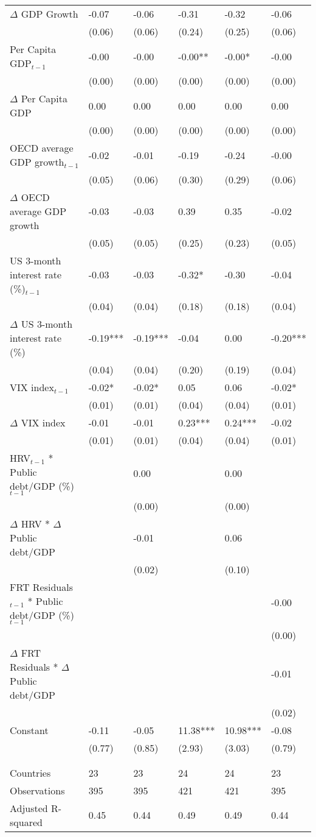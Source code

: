 \begin{tabular}{lp{3cm}p{3cm}p{3cm}p{3cm}p{3cm}}
  $\Delta$ GDP Growth & -0.07 & -0.06 & -0.31 & -0.32 & -0.06 \\ 
   & (0.06) & (0.06) & (0.24) & (0.25) & (0.06) \\ 
  Per Capita GDP$_{t-1}$ & -0.00 & -0.00 & -0.00** & -0.00* & -0.00 \\ 
   & (0.00) & (0.00) & (0.00) & (0.00) & (0.00) \\ 
  $\Delta$ Per Capita GDP & 0.00 & 0.00 & 0.00 & 0.00 & 0.00 \\ 
   & (0.00) & (0.00) & (0.00) & (0.00) & (0.00) \\ 
  OECD average GDP growth$_{t-1}$ & -0.02 & -0.01 & -0.19 & -0.24 & -0.00 \\ 
   & (0.05) & (0.06) & (0.30) & (0.29) & (0.06) \\ 
  $\Delta$ OECD average GDP growth & -0.03 & -0.03 & 0.39 & 0.35 & -0.02 \\ 
   & (0.05) & (0.05) & (0.25) & (0.23) & (0.05) \\ 
  US 3-month interest rate (\%)$_{t-1}$ & -0.03 & -0.03 & -0.32* & -0.30 & -0.04 \\ 
   & (0.04) & (0.04) & (0.18) & (0.18) & (0.04) \\ 
  $\Delta$ US 3-month interest rate (\%) & -0.19*** & -0.19*** & -0.04 & 0.00 & -0.20*** \\ 
   & (0.04) & (0.04) & (0.20) & (0.19) & (0.04) \\ 
  VIX index$_{t-1}$ & -0.02* & -0.02* & 0.05 & 0.06 & -0.02* \\ 
   & (0.01) & (0.01) & (0.04) & (0.04) & (0.01) \\ 
  $\Delta$ VIX index & -0.01 & -0.01 & 0.23*** & 0.24*** & -0.02 \\ 
   & (0.01) & (0.01) & (0.04) & (0.04) & (0.01) \\ 
  HRV$_{t-1}$ * Public debt/GDP (\%)$_{t-1}$ &  & 0.00 &  & 0.00 &  \\ 
   &  & (0.00) &  & (0.00) &  \\ 
  $\Delta$ HRV * $\Delta$ Public debt/GDP &  & -0.01 &  & 0.06 &  \\ 
   &  & (0.02) &  & (0.10) &  \\ 
  FRT Residuals$_{t-1}$ * Public debt/GDP (\%)$_{t-1}$ &  &  &  &  & -0.00 \\ 
   &  &  &  &  & (0.00) \\ 
  $\Delta$ FRT Residuals * $\Delta$ Public debt/GDP &  &  &  &  & -0.01 \\ 
   &  &  &  &  & (0.02) \\ 
  Constant & -0.11 & -0.05 & 11.38*** & 10.98*** & -0.08 \\ 
   & (0.77) & (0.85) & (2.93) & (3.03) & (0.79) \\ 
   &  &  &  &  &  \\ 
   &  &  &  &  &  \\ 
  Countries & 23 & 23 & 24 & 24 & 23 \\ 
  Observations & 395 & 395 & 421 & 421 & 395 \\ 
  Adjusted R-squared & 0.45 & 0.44 & 0.49 & 0.49 & 0.44 \\ 
   \hline
\end{tabular}
\endgroup
